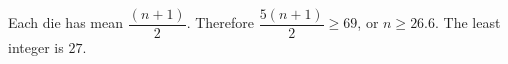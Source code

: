 Each die has mean $\dfrac{(n+1)}{2}$. Therefore $\dfrac{5(n+1)}{2}\ge69$, or $n\ge26.6$. The least integer is $\boxed{27}$.
